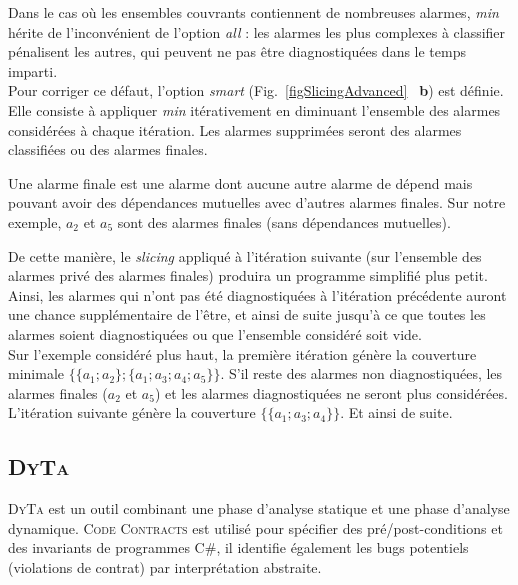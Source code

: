 Dans le cas où les ensembles couvrants contiennent de nombreuses alarmes,
{\em min} hérite de l'inconvénient de l'option {\em all} : les alarmes les plus
complexes à classifier pénalisent les autres, qui peuvent ne pas être
diagnostiquées dans le temps imparti.\\

Pour corriger ce défaut, l'option {\em smart} (Fig.~\ref{figSlicingAdvanced}
~\textbf{b}) est définie. Elle consiste à appliquer {\em min} itérativement en
diminuant l'ensemble des alarmes considérées à chaque itération. Les alarmes
supprimées seront des alarmes classifiées ou des alarmes finales.

\begin{definition}
Une alarme finale est une alarme dont aucune autre alarme de dépend mais
pouvant avoir des dépendances mutuelles avec d'autres alarmes finales.
Sur notre exemple, $a_2$ et $a_5$ sont des alarmes finales (sans dépendances
mutuelles).
\end{definition}

De cette manière, le {\em slicing} appliqué à l'itération suivante (sur
l'ensemble des alarmes privé des alarmes finales) produira un programme
simplifié plus petit. Ainsi, les alarmes qui n'ont pas été diagnostiquées à
l'itération précédente auront une chance supplémentaire de l'être, et ainsi de
suite jusqu'à ce que toutes les alarmes soient diagnostiquées ou que l'ensemble
considéré soit vide.\\

Sur l'exemple considéré plus haut, la première itération génère la
couverture minimale $\{\{a_1; a_2\}; \{a_1; a_3; a_4; a_5\}\}$. S'il reste des
alarmes non diagnostiquées, les alarmes finales ($a_2$ et $a_5$) et les alarmes
diagnostiquées ne seront plus considérées. L'itération suivante génère la
couverture $\{\{a_1; a_3; a_4\}\}$. Et ainsi de suite.


\subsection{\textsc{DyTa}}

\textsc{DyTa} \cite{DyTa} est un outil combinant une phase d'analyse statique et
une phase d'analyse dynamique. \textsc{Code Contracts} \cite{CodeContracts} est
utilisé pour spécifier des pré/post-conditions et des invariants de programmes
C\#, il identifie également les bugs potentiels (violations de contrat) par
interprétation abstraite.\\

